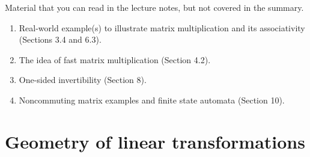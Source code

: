 \documentclass[10pt]{amsart}
\begin{document}
Material that you can read in the lecture notes, but not covered in the
summary.

\begin{enumerate}
\item Real-world example(s) to illustrate matrix multiplication and
  its associativity (Sections 3.4 and 6.3).
\item The idea of fast matrix multiplication (Section 4.2).
\item One-sided invertibility (Section 8).
\item Noncommuting matrix examples and finite state automata (Section 10).
\end{enumerate}

\section{Geometry of linear transformations}
\end{document}

